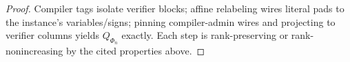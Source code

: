 \documentclass[12pt]{article}
\theoremstyle{definition}
\theoremstyle{definition}
\theoremstyle{remark}
\theoremstyle{remark}
\begin{document}
\begin{proof}
Compiler tags isolate verifier blocks; affine relabeling wires literal pads to the instance's variables/signs; pinning compiler-admin wires and projecting to verifier columns yields $Q_{\Phi_n}$ exactly.
Each step is rank-preserving or rank-nonincreasing by the cited properties above.
\end{proof}

\end{document}

